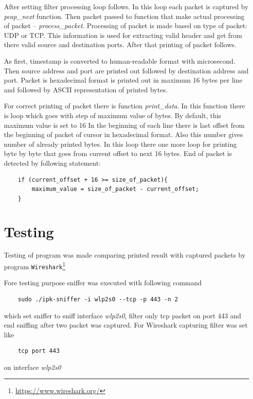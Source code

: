 \documentclass[12pt,a4paper]{article}
\begin{document}
After setting filter processing loop follows. In this loop each packet is 
captured by \textit{pcap\_next} function. Then packet passed to function that 
make actual processing of packet -- \textit{process\_packet}. Processing of 
packet is made based on type of packet: UDP or TCP. This information is used for 
extracting valid header and get from there valid source and destination ports. 
After that printing of packet follows. 

As first, timestamp is converted to human-readable format with microsecond. 
Then source address and port are printed out followed by destination address and 
port. Packet is hexadecimal format is printed out in maximum 16 bytes per line 
and followed by ASCII representation of printed bytes. 

For correct printing of packet there is function \textit{print\_data}. In this 
function there is loop which goes with step of maximum value of bytes. By 
default, this maximum value is set to 16 In the beginning of each line there is 
last offset from the beginning of packet of cursor in hexadecimal format. Also 
this number gives number of already printed bytes. In this loop there one more 
loop for printing byte by byte that goes from current offset to next 16 bytes. 
End of packet is detected by following statement:
\begin{verbatim}
    if (current_offset + 16 >= size_of_packet){
        maximum_value = size_of_packet - current_offset;
    }
\end{verbatim}

\section{Testing}

Testing of program was made comparing printed result with captured packets by 
program \texttt{Wireshark}\footnote{\url{https://www.wireshark.org/}} 

Fore testing purpose sniffer was executed with following command
\begin{verbatim}
    sudo ./ipk-sniffer -i wlp2s0 --tcp -p 443 -n 2 
\end{verbatim}
which set sniffer to sniff interface \textit{wlp2s0}, filter only tcp packet on 
port 443 and end sniffing after two packet was captured. For Wireshark capturing 
filter was set like 
\begin{verbatim}
    tcp port 443
\end{verbatim} 
on interface \textit{wlp2s0}
\end{document}
